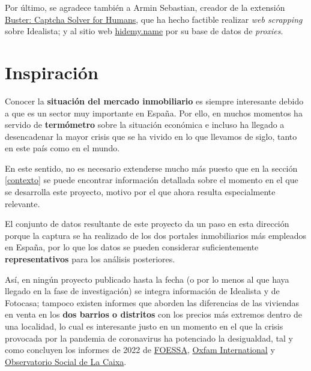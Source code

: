 \documentclass[12pt]{article}
\begin{document}
Por último, se agradece también a Armin Sebastian, creador de la extensión \href{https://chrome.google.com/webstore/detail/buster-captcha-solver-for/mpbjkejclgfgadiemmefgebjfooflfhl}{Buster: Captcha Solver for Humans}, que ha hecho factible realizar \textit{web scrapping} sobre Idealista; y al sitio web \href{https://hidemy.name/proxy-list/}{hidemy.name} por su base de datos de \textit{proxies}.

\newpage
\vspace{-1.5em}\section{Inspiración}\vspace{-1em}

Conocer la \textbf{situación del mercado inmobiliario} es siempre interesante debido a que es un sector muy importante en España. Por ello, en muchos momentos ha servido de \textbf{termómetro} sobre la situación económica e incluso ha llegado a desencadenar la mayor crisis que se ha vivido en lo que llevamos de siglo, tanto en este país como en el mundo. 

En este sentido, no es necesario extenderse mucho más puesto que en la sección \ref{contexto} se puede encontrar información detallada sobre el momento en el que se desarrolla este proyecto, motivo por el que ahora resulta especialmente relevante.

El conjunto de datos resultante de este proyecto da un paso en esta dirección porque la captura se ha realizado de los dos portales inmobiliarios más empleados en España, por lo que los datos se pueden considerar suficientemente \textbf{representativos} para los análisis posteriores. 

Así, en ningún proyecto publicado hasta la fecha (o por lo menos al que haya llegado en la fase de investigación) se integra información de Idealista y de Fotocasa; tampoco existen informes que aborden las diferencias de las viviendas en venta en los \textbf{dos barrios o distritos} con los precios más extremos dentro de una localidad, lo cual es interesante justo en un momento en el que la crisis provocada por la pandemia de coronavirus ha potenciado la desigualdad, tal y como concluyen los informes de 2022 de \href{https://www.foessa.es/blog/foessa-presenta-la-primera-radiografia-social-completa-de-la-crisis-de-la-covid-19-en-toda-espana/}{FOESSA}, \href{https://oxfamilibrary.openrepository.com/bitstream/handle/10546/621341/bp-inequality-kills-170122-es.pdf}{Oxfam International} y \href{https://elobservatoriosocial.fundacionlacaixa.org/documents/22890/492074/T01_ID_ES_AyalaCant%C3%B3.pdf/a0746431-109f-e009-6c77-296c378f0438?t=1642072938395}{Observatorio Social de La Caixa}.
\end{document}
